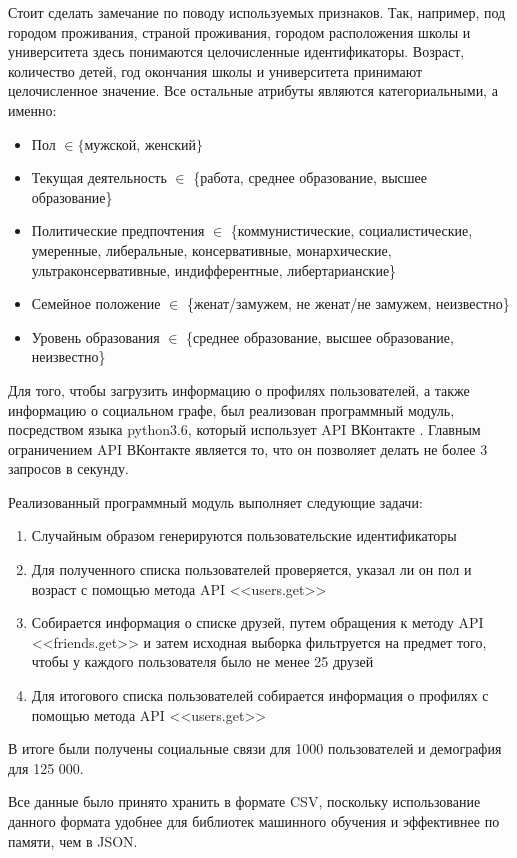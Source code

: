 Стоит сделать замечание по поводу используемых признаков. Так, например, под городом проживания, страной проживания, городом расположения школы и университета здесь понимаются целочисленные идентификаторы. Возраст, количество детей, год окончания школы и университета принимают целочисленное значение. Все остальные атрибуты являются категориальными, а именно:
\begin{itemize}
\item Пол $\in \{\text{мужской, женский}\}$
\item Текущая деятельность $\in$ \{работа, среднее образование, высшее образование\}
\item Политические предпочтения $\in$ \{коммунистические, социалистические, умеренные, либеральные, консервативные, монархические, ультраконсервативные, индифферентные, либертарианские\}
\item Семейное положение $\in$ \{женат/замужем, не женат/не замужем, неизвестно\}
\item Уровень образования $\in$ \{среднее образование, высшее образование, неизвестно\}
\end{itemize}


Для того, чтобы загрузить информацию о профилях пользователей, а также информацию о социальном графе,  был реализован программный модуль, посредством языка python3.6, который использует API ВКонтакте \cite{API VK}. Главным ограничением API ВКонтакте является то, что он позволяет делать не более 3 запросов в секунду.

Реализованный программный модуль выполняет следующие задачи:
\begin{enumerate}
\item Случайным образом генерируются пользовательские идентификаторы 
\item Для полученного списка пользователей проверяется, указал ли он пол и возраст с помощью метода API <<users.get>>
\item Собирается информация о списке друзей, путем обращения к методу API <<friends.get>> и затем исходная выборка фильтруется на предмет того, чтобы у каждого пользователя было не менее 25 друзей
\item Для итогового списка пользователей собирается информация о профилях с помощью метода API <<users.get>>
\end{enumerate}

В итоге были получены социальные связи для 1000 пользователей и демография для 125 000.

Все данные было принято хранить в формате CSV, поскольку использование данного формата удобнее для библиотек машинного обучения и эффективнее по памяти, чем в JSON.

